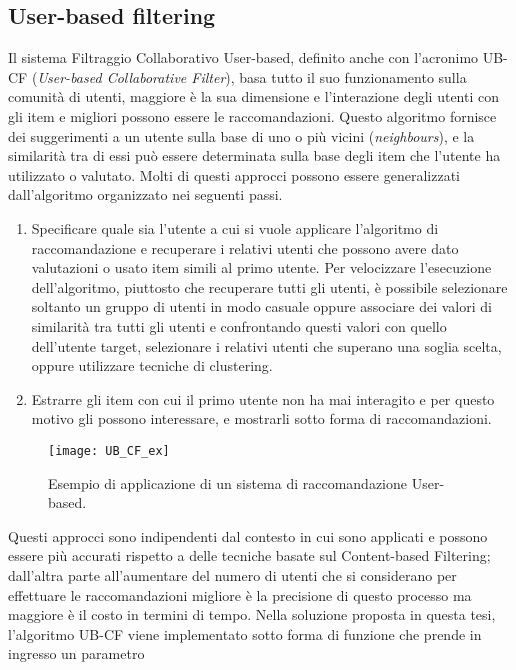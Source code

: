 \subsection{User-based filtering}
Il sistema Filtraggio Collaborativo User-based, definito anche con l'acronimo UB-CF (\textit{User-based Collaborative Filter}), basa tutto il suo 
funzionamento sulla comunità di utenti, maggiore è la sua dimensione e l'interazione degli utenti con gli item e migliori possono essere le 
raccomandazioni. Questo algoritmo fornisce dei suggerimenti a un utente sulla base di uno o più vicini (\textit{neighbours}), e la similarità 
tra di essi può essere determinata sulla base degli item che l'utente ha utilizzato o valutato.\hfill\break
Molti di questi approcci possono essere generalizzati dall'algoritmo organizzato nei seguenti passi.
\begin{enumerate}
    \item Specificare quale sia l'utente a cui si vuole applicare l'algoritmo di raccomandazione e recuperare i relativi utenti che possono 
    avere dato valutazioni o usato item simili al primo utente. Per velocizzare l'esecuzione dell'algoritmo, piuttosto che recuperare tutti 
    gli utenti, è possibile selezionare soltanto un gruppo di utenti in modo casuale oppure associare dei valori di similarità tra 
    tutti gli utenti e confrontando questi valori con quello dell'utente target, selezionare i relativi utenti che superano una soglia 
    scelta, oppure utilizzare tecniche di clustering.
    \item Estrarre gli item con cui il primo utente non ha mai interagito e per questo motivo gli possono interessare, e mostrarli 
    sotto forma di raccomandazioni.
\end{enumerate}
\begin{figure}[ht!]
    \centering
    \texttt{[image: UB\_CF\_ex]}
    \caption[Applicazione di un sistema di raccomandazione UB-CF]{Esempio di applicazione di un sistema di raccomandazione User-based.}
    \label{fig:UB_CF}
\end{figure}
%
Questi approcci sono indipendenti dal contesto in cui sono applicati e possono essere più accurati rispetto 
a delle tecniche basate sul Content-based Filtering; dall'altra parte all'aumentare del numero di utenti che si considerano per 
effettuare le raccomandazioni migliore è la precisione di questo processo ma maggiore è il costo in termini di tempo.\hfill\break
Nella soluzione proposta in questa tesi, l'algoritmo UB-CF viene implementato sotto forma di funzione che prende in ingresso un parametro 
